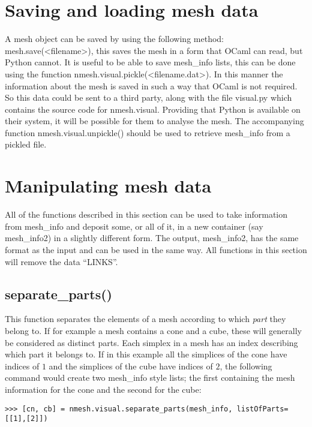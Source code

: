 \section{Saving and loading mesh data \label{sec:pickle}}
A mesh object can be saved by using the following method: {\ttfamily mesh.save(<filename>)}, this saves the mesh in a form that OCaml can read, but Python cannot. It is useful to be able to save {\ttfamily mesh\_info} lists, this can be done using the function 
{\ttfamily nmesh.visual.pickle(<filename.dat>)}. In this manner the information about the mesh is saved in such a way that OCaml is not required. So this data could be sent to a third party, along with the file {\ttfamily visual.py} which contains the source code for {\ttfamily nmesh.visual}. Providing that Python is available on their system, it will be possible for them to analyse the mesh. The accompanying function 
{\ttfamily nmesh.visual.unpickle()} should be used to retrieve {\ttfamily mesh\_info} from a pickled file.




\section{Manipulating mesh data}
All of the functions described in this section can be used to take information from {\ttfamily mesh\_info} and deposit some, or all of it, in a new container (say {\ttfamily mesh\_info2}) in a slightly different form. The output, {\ttfamily mesh\_info2}, has the same format as the input and can be used in the same way. All functions in this section will remove the data {\ttfamily ``LINKS''}. 

\subsection{{\ttfamily separate\_parts()}}
This function separates the elements of a mesh according to which {\em part} they belong to. If for example a mesh contains a cone and a cube, these will generally be considered as distinct parts. Each simplex in a mesh has an index describing which part it belongs to. If in this example all the simplices of the cone have indices of $1$ and the simplices of the cube have indices of $2$, the following command would create two {\ttfamily mesh\_info} style lists; the first containing the mesh information for the cone and the second for the cube:

\begin{lstlisting}[basicstyle=\small\ttfamily]
>>> [cn, cb] = nmesh.visual.separate_parts(mesh_info, listOfParts=[[1],[2]])
\end{lstlisting}



